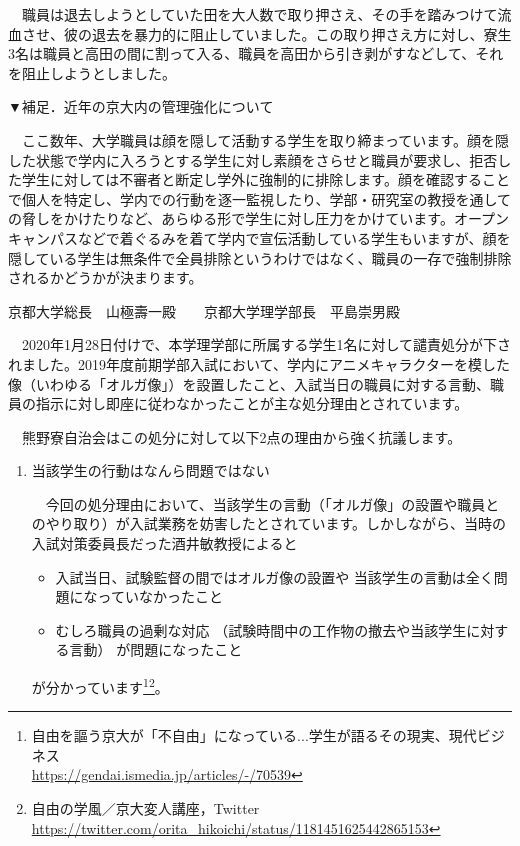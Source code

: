 {\begin{tcolorbox}[colback=white, colbacktitle=gray!30!white, coltitle=black, title=熊野寮生３名に対する無期停学処分の撤回を求める声明,breakable]
    　職員は退去しようとしていた田を大人数で取り押さえ、その手を踏みつけて流血させ、彼の退去を暴力的に阻止していました。この取り押さえ方に対し、寮生3名は職員と高田の間に割って入る、職員を高田から引き剥がすなどして、それを阻止しようとしました。
    
    \vspace{5mm}
    \noindent ▼補足．近年の京大内の管理強化について
    
    　ここ数年、大学職員は顔を隠して活動する学生を取り締まっています。顔を隠した状態で学内に入ろうとする学生に対し素顔をさらせと職員が要求し、拒否した学生に対しては不審者と断定し学外に強制的に排除します。顔を確認することで個人を特定し、学内での行動を逐一監視したり、学部・研究室の教授を通しての脅しをかけたりなど、あらゆる形で学生に対し圧力をかけています。オープンキャンパスなどで着ぐるみを着て学内で宣伝活動している学生もいますが、顔を隠している学生は無条件で全員排除というわけではなく、職員の一存で強制排除されるかどうかが決まります。
\end{tcolorbox}


\begin{tcolorbox}[colback=white, colbacktitle=gray!30!white, coltitle=black, title=2019年学部入試における「オルガ像」設置を理由とした学生処分についての抗議文,breakable]

    \begin{flushleft}
    京都大学総長　山極壽一殿　　京都大学理学部長　平島崇男殿
    \end{flushleft}
    
    　2020年1月28日付けで、本学理学部に所属する学生1名に対して譴責処分が下されました。2019年度前期学部入試において、学内にアニメキャラクターを模した像（いわゆる「オルガ像」）を設置したこと、入試当日の職員に対する言動、職員の指示に対し即座に従わなかったことが主な処分理由とされています。
    
    　熊野寮自治会はこの処分に対して以下2点の理由から強く抗議します。
    \begin{enumerate}
        \item 当該学生の行動はなんら問題ではない
    
        　今回の処分理由において、当該学生の言動（「オルガ像」の設置や職員とのやり取り）が入試業務を妨害したとされています。しかしながら、当時の入試対策委員長だった酒井敏教授によると
        \begin{itemize}
            \item 入試当日、試験監督の間ではオルガ像の設置や
            当該学生の言動は全く問題になっていなかったこと
            \item むしろ職員の過剰な対応
            （試験時間中の工作物の撤去や当該学生に対する言動）
            が問題になったこと
        \end{itemize}
        が分かっています\footnote{自由を謳う京大が「不自由」になっている...学生が語るその現実、現代ビジネス\\
        \url{https://gendai.ismedia.jp/articles/-/70539}}\footnote{自由の学風／京大変人講座，Twitter\\
        \url{https://twitter.com/orita_hikoichi/status/1181451625442865153}}。
        

\end{enumerate}
\end{tcolorbox}}
